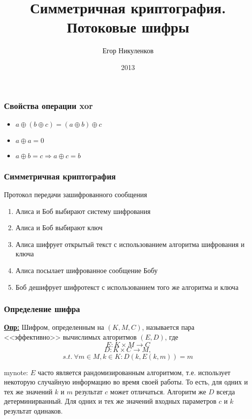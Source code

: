\documentclass{beamer}
\title{Симметричная криптография. Потоковые шифры}
\author{Егор Никуленков}
\institute{ВГУ}
\date{2013}
\newcommand{\longdef}[1]{{\textbf{\underline{Опр:}} #1}}
\newcommand{\mynote}[1]{mynote: #1}
\newcommand{\mynote}[1]{}
\begin{document}
\frame{\titlepage}

\begin{frame}
  \frametitle{Свойства операции xor}

  \begin{itemize}
    \item{$a \oplus (b \oplus c) = (a \oplus b) \oplus c$}
    \item{$a \oplus a = 0$}
    \item{$a \oplus b = c \Rightarrow a \oplus c = b$}
  \end{itemize}
\end{frame}


\begin{frame}
  \frametitle{Симметричная криптография}

  \begin{block}{Протокол передачи зашифрованного сообщения}
  \begin{enumerate}
    \item{Алиса и Боб выбирают систему шифрования}
    \item{Алиса и Боб выбирают ключ}
    \item{Алиса шифрует открытый текст с использованием алгоритма шифрования и ключа}
    \item{Алиса посылает шифрованное сообщение Бобу}
    \item{Боб дешифрует шифротекст с использованием того же алгоритма и ключа}
  \end{enumerate}
  \end{block}
\end{frame}


\begin{frame}
  \frametitle{Определение шифра}

  \longdef{Шифром, определенным на $(K,M,C)$, называется пара <<эффективно>> вычислимых алгоритмов $(E,D)$, где \newline
    \[E: K \times M \longrightarrow C \]
    \[D: K \times C \longrightarrow M, \]
    \[s.t. ~ \forall m \in M, k \in K: D(k, E(k,m)) = m \]
  }

  \mynote{
  $E$ часто является рандомизированным алгоритмом, т.е. использует
  некоторую случайную информацию во время своей работы. То есть, для одних
  и тех же значений  $k$ и $m$ результат $c$ может отличаться.
  Алгоритм же $D$ всегда детерминирванный. Для одних и тех же значений
  входных параметров $c$ и $k$ результат одинаков.
  }
\end{frame}
\end{document}
